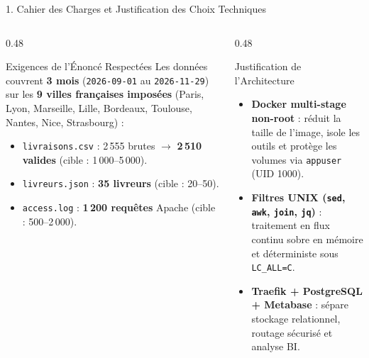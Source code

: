 \documentclass[aspectratio=169,10pt]{beamer}
\begin{document}
\begin{frame}{1. Cahier des Charges et Justification des Choix Techniques}
    \begin{columns}[T]
        \begin{column}{0.48\textwidth}
            \begin{block}{Exigences de l'\'Enonc\'e Respect\'ees}
                \footnotesize\justifying
                Les donn\'ees couvrent \textbf{3 mois} (\texttt{2026-09-01} au \texttt{2026-11-29}) sur les \textbf{9 villes fran\c{c}aises impos\'ees} (Paris, Lyon, Marseille, Lille, Bordeaux, Toulouse, Nantes, Nice, Strasbourg) :
                \begin{itemize}
                    \item \texttt{livraisons.csv} : 2\,555 brutes $\rightarrow$ \textbf{2\,510 valides} (cible : 1\,000--5\,000).
                    \item \texttt{livreurs.json} : \textbf{35 livreurs} (cible : 20--50).
                    \item \texttt{access.log} : \textbf{1\,200 requ\^etes} Apache (cible : 500--2\,000).
                \end{itemize}
            \end{block}
        \end{column}
        \begin{column}{0.48\textwidth}
            \begin{exampleblock}{Justification de l'Architecture}
                \footnotesize\justifying
                \begin{itemize}
                    \item \textbf{Docker multi-stage non-root} : r\'eduit la taille de l'image, isole les outils et prot\`ege les volumes via \texttt{appuser} (UID 1000).
                    \item \textbf{Filtres UNIX (\texttt{sed}, \texttt{awk}, \texttt{join}, \texttt{jq})} : traitement en flux continu sobre en m\'emoire et d\'eterministe sous \texttt{LC\_ALL=C}.
                    \item \textbf{Traefik + PostgreSQL + Metabase} : s\'epare stockage relationnel, routage s\'ecuris\'e et analyse BI.
                \end{itemize}
            \end{exampleblock}
        \end{column}
    \end{columns}
\end{frame}
\end{document}

